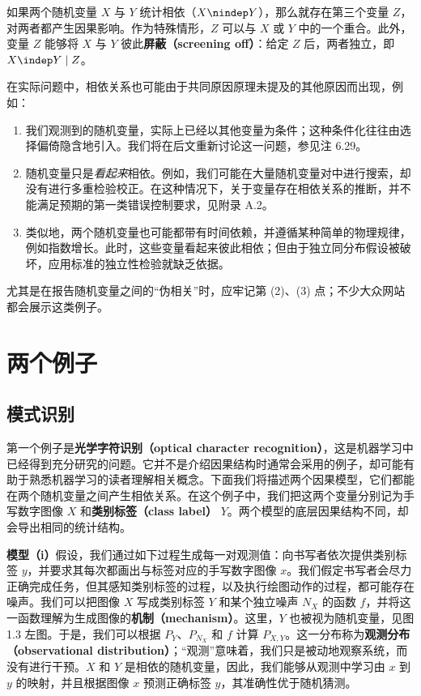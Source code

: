 

\begin{principle}
\label{principle:1.1}
如果两个随机变量 $X$ 与 $Y$ 统计相依（$X\nindep Y$），那么就存在第三个变量 $Z$，对两者都产生因果影响。作为特殊情形，$Z$ 可以与 $X$ 或 $Y$ 中的一个重合。此外，变量 $Z$ 能够将 $X$ 与 $Y$ 彼此\textbf{屏蔽（screening off）}：给定 $Z$ 后，两者独立，即 $X\indep Y\mid Z$。
\end{principle}

在实际问题中，相依关系也可能由于共同原因原理未提及的其他原因而出现，例如：
\begin{enumerate}[label=(\arabic*)]
 \item 我们观测到的随机变量，实际上已经以其他变量为条件；这种条件化往往由选择偏倚隐含地引入。我们将在后文重新讨论这一问题，参见注 6.29。
 \item 随机变量只是\emph{看起来}相依。例如，我们可能在大量随机变量对中进行搜索，却没有进行多重检验校正。在这种情况下，关于变量存在相依关系的推断，并不能满足预期的第一类错误控制要求，见附录 A.2。
 \item 类似地，两个随机变量也可能都带有时间依赖，并遵循某种简单的物理规律，例如指数增长。此时，这些变量看起来彼此相依；但由于独立同分布假设被破坏，应用标准的独立性检验就缺乏依据。
\end{enumerate}
尤其是在报告随机变量之间的“伪相关”时，应牢记第 (2)、(3) 点；不少大众网站都会展示这类例子。


\FloatBarrier
\section{两个例子}
\label{sec:two-examples}

\subsection{模式识别}
\label{sec:pattern-recognition}

第一个例子是\textbf{光学字符识别（optical character recognition）}，这是机器学习中已经得到充分研究的问题。它并不是介绍因果结构时通常会采用的例子，却可能有助于熟悉机器学习的读者理解相关概念。下面我们将描述两个因果模型，它们都能在两个随机变量之间产生相依关系。在这个例子中，我们把这两个变量分别记为手写数字图像 $X$ 和\textbf{类别标签（class label）} $Y$。两个模型的底层因果结构不同，却会导出相同的统计结构。

\textbf{模型（i）}假设，我们通过如下过程生成每一对观测值：向书写者依次提供类别标签 $y$，并要求其每次都画出与标签对应的手写数字图像 $x$。我们假定书写者会尽力正确完成任务，但其感知类别标签的过程，以及执行绘图动作的过程，都可能存在噪声。我们可以把图像 $X$ 写成类别标签 $Y$ 和某个独立噪声 $N_X$ 的函数 $f$，并将这一函数理解为生成图像的\textbf{机制（mechanism）}。这里，$Y$ 也被视为随机变量，见图 1.3 左图。于是，我们可以根据 $P_Y$、$P_{N_X}$ 和 $f$ 计算 $P_{X,Y}$。这一分布称为\textbf{观测分布（observational distribution）}；“观测”意味着，我们只是被动地观察系统，而没有进行干预。$X$ 和 $Y$ 是相依的随机变量，因此，我们能够从观测中学习由 $x$ 到 $y$ 的映射，并且根据图像 $x$ 预测正确标签 $y$，其准确性优于随机猜测。


